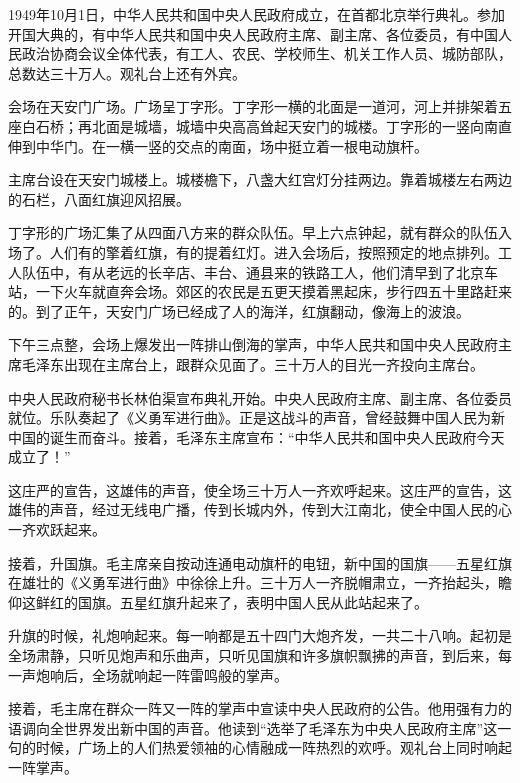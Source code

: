 \documentclass[12pt,UTF-8,openany]{ctexbook}
\begin{document}
\begin{large}
    
    1949年10月1日，中华人民共和国中央人民政府成立，在首都北京举行典礼。参加开国大典的，有中华人民共和国中央人民政府主席、副主席、各位委员，有中国人民政治协商会议全体代表，有工人、农民、学校师生、机关工作人员、城防部队，总数达三十万人。观礼台上还有外宾。
    
    会场在天安门广场。广场呈丁字形。丁字形一横的北面是一道河，河上并排架着五座白石桥；再北面是城墙，城墙中央高高耸起天安门的城楼。丁字形的一竖向南直伸到中华门。在一横一竖的交点的南面，场中挺立着一根电动旗杆。
    
    主席台设在天安门城楼上。城楼檐下，八盏大红宫灯分挂两边。靠着城楼左右两边的石栏，八面红旗迎风招展。
    
    丁字形的广场汇集了从四面八方来的群众队伍。早上六点钟起，就有群众的队伍入场了。人们有的擎着红旗，有的提着红灯。进入会场后，按照预定的地点排列。工人队伍中，有从老远的长辛店、丰台、通县来的铁路工人，他们清早到了北京车站，一下火车就直奔会场。郊区的农民是五更天摸着黑起床，步行四五十里路赶来的。到了正午，天安门广场已经成了人的海洋，红旗翻动，像海上的波浪。
    
    下午三点整，会场上爆发出一阵排山倒海的掌声，中华人民共和国中央人民政府主席毛泽东出现在主席台上，跟群众见面了。三十万人的目光一齐投向主席台。
    
    中央人民政府秘书长林伯渠宣布典礼开始。中央人民政府主席、副主席、各位委员就位。乐队奏起了《义勇军进行曲》。正是这战斗的声音，曾经鼓舞中国人民为新中国的诞生而奋斗。接着，毛泽东主席宣布：“中华人民共和国中央人民政府今天成立了！”
    
    这庄严的宣告，这雄伟的声音，使全场三十万人一齐欢呼起来。这庄严的宣告，这雄伟的声音，经过无线电广播，传到长城内外，传到大江南北，使全中国人民的心一齐欢跃起来。
    
    接着，升国旗。毛主席亲自按动连通电动旗杆的电钮，新中国的国旗——五星红旗在雄壮的《义勇军进行曲》中徐徐上升。三十万人一齐脱帽肃立，一齐抬起头，瞻仰这鲜红的国旗。五星红旗升起来了，表明中国人民从此站起来了。
    
    升旗的时候，礼炮响起来。每一响都是五十四门大炮齐发，一共二十八响。起初是全场肃静，只听见炮声和乐曲声，只听见国旗和许多旗帜飘拂的声音，到后来，每一声炮响后，全场就响起一阵雷鸣般的掌声。
    
    接着，毛主席在群众一阵又一阵的掌声中宣读中央人民政府的公告。他用强有力的语调向全世界发出新中国的声音。他读到“选举了毛泽东为中央人民政府主席”这一句的时候，广场上的人们热爱领袖的心情融成一阵热烈的欢呼。观礼台上同时响起一阵掌声。
    

\end{large}
\end{document}
